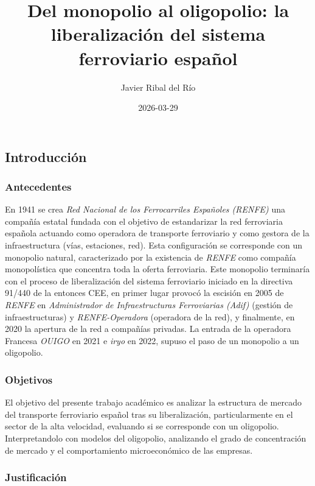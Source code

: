 \documentclass[
  letterpaper,
  DIV=11,
  numbers=noendperiod]{scrartcl}
\title{Del monopolio al oligopolio: la liberalización del sistema
ferroviario español}
\author{Javier Ribal del Río}
\date{2026-03-29}
\begin{document}
\maketitle


\subsection{Introducción}\label{introducciuxf3n}

\subsubsection{Antecedentes}\label{antecedentes}

En 1941 se crea \emph{Red Nacional de los Ferrocarriles Españoles
(RENFE)} una compañía estatal fundada con el objetivo de estandarizar la
red ferroviaria española actuando como operadora de transporte
ferroviario y como gestora de la infraestructura (vías, estaciones,
red). Esta configuración se corresponde con un monopolio natural,
caracterizado por la existencia de \emph{RENFE} como compañía
monopolística que concentra toda la oferta ferroviaria. Este monopolio
terminaría con el proceso de liberalización del sistema ferroviario
iniciado en la directiva 91/440 de la entonces CEE, en primer lugar
provocó la escisión en 2005 de \emph{RENFE} en \emph{Administrador de
Infraestructuras Ferroviarias (Adif)} (gestión de infraestructuras) y
\emph{RENFE-Operadora} (operadora de la red), y finalmente, en 2020 la
apertura de la red a compañías privadas. La entrada de la operadora
Francesa \emph{OUIGO} en 2021 e \emph{iryo} en 2022, supuso el paso de
un monopolio a un oligopolio.

\subsubsection{Objetivos}\label{objetivos}

El objetivo del presente trabajo académico es analizar la estructura de
mercado del transporte ferroviario español tras su liberalización,
particularmente en el sector de la alta velocidad, evaluando si se
corresponde con un oligopolio. Interpretandolo con modelos del
oligopolio, analizando el grado de concentración de mercado y el
comportamiento microeconómico de las empresas.

\subsubsection{Justificación}\label{justificaciuxf3n}
\end{document}
